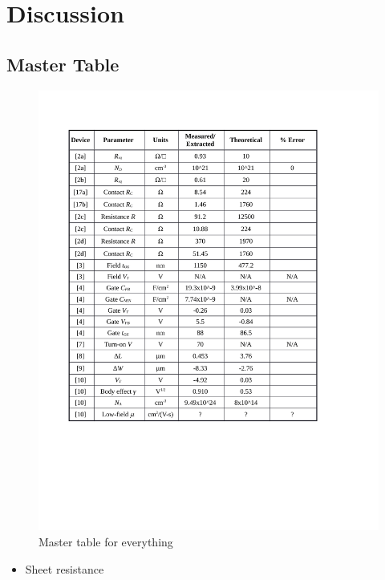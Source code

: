 \documentclass{article}
\begin{document}
\section{Discussion}
\subsection{Master Table}
\begin{figure}[H]
\centering
\includegraphics[width=600pt]{master_table.pdf}
\caption{Master table for everything}
\end{figure}

\begin{itemize}
\item Sheet resistance

\end{itemize}
\end{document}
